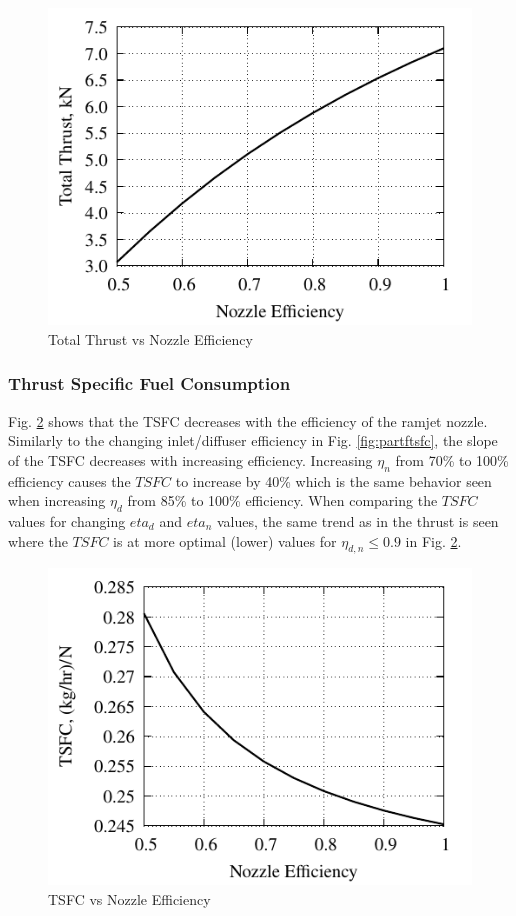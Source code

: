 \documentclass[conf]{new-aiaa} %
\begin{document}
\begin{figure}[H] %
    \centering
    \includegraphics[]{media/performance_parameter_files/part_g_T.pdf}
    \caption{\label{fig:partgt}Total Thrust vs Nozzle Efficiency}
\end{figure}

\subsubsection{Thrust Specific Fuel Consumption}
Fig. \ref{fig:partgtsfc} shows that the TSFC decreases with the efficiency of the ramjet nozzle. Similarly to the changing inlet/diffuser efficiency in Fig. \ref{fig:partftsfc}, the slope of the TSFC decreases with increasing efficiency. Increasing $\eta_n$ from 70\% to 100\% efficiency causes the $TSFC$ to increase by 40\% which is the same behavior seen when increasing $\eta_d$ from 85\% to 100\% efficiency. When comparing the $TSFC$ values for changing $eta_d$ and $eta_n$ values, the same trend as in the thrust is seen where the $TSFC$ is at more optimal (lower) values for $\eta_{d,n}\leq0.9$ in Fig. \ref{fig:partgtsfc}.

\begin{figure}[H] %
    \centering
    \includegraphics[]{media/performance_parameter_files/part_g_TSFC.pdf}
    \caption{\label{fig:partgtsfc}TSFC vs Nozzle Efficiency}
\end{figure}
\end{document}
